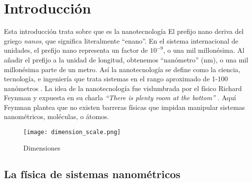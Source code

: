 \chapter*{Introducción}

Esta introducción trata sobre que es la nanotecnología
El prefijo nano deriva del griego \emph{nanos}, que significa literalmente ``enano''. En el sistema internacional de unidades, el prefijo nano representa un factor de $\mathrm{10^{-9}}$, o una mil millonésima. Al añadir el prefijo a la unidad de longitud, obtenemos ``nanómetro'' (nm), o una mil millonésima parte de un metro. Así la nanotecnología se define como la ciencia, tecnología, e ingeniería que trata sistemas en el rango aproximado de 1-100 nanómetros \citep{Haick2013}.
La idea de la nanotecnología fue vislumbrada por el físico Richard Feynman y expuesta en su charla \emph{``There is plenty room at the bottom''} \citep{Feynman1960}. Aquí Feynman plantea que no existen barreras físicas que impidan manipular sistemas nanométricos, moléculas, o átomos.

\begin{figure}
	\centering
	\texttt{[image: dimension\_scale.png]}
	\caption{Dimensiones}
	\label{fig:scale}
\end{figure}

\section*{La física de sistemas nanométricos}

